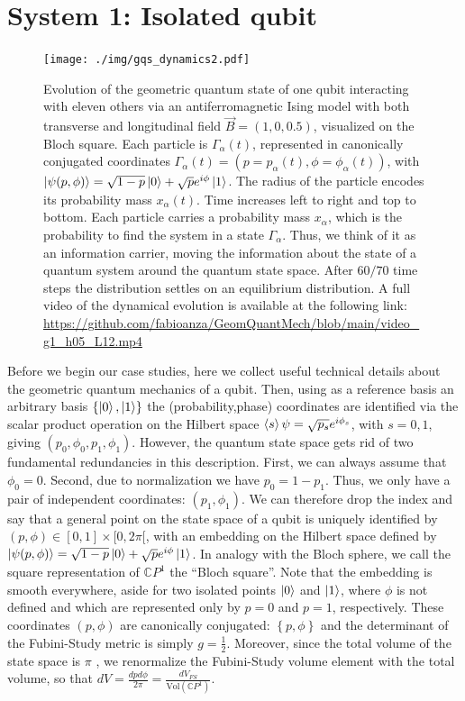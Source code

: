 \documentclass[draft,nofootinbib,pre,twocolumn,showpacs,showkeys,preprintnumbers,floatfix]{revtex4-1}
\newcommand{\1}{\mathbbm{1}}
\begin{document}
\section{System 1: Isolated qubit}
\label{sec:EXAMPLES1}


\begin{figure}[t!]
\centering
\texttt{[image: ./img/gqs\_dynamics2.pdf]}
\caption{Evolution of the geometric quantum state of one qubit interacting with 
	eleven others via an antiferromagnetic Ising model with both transverse and longitudinal field $\vec{B} = (1,0,0.5)$, 
	visualized on the Bloch square. Each particle is $\Gamma_\alpha(t)$, represented in canonically conjugated 
	coordinates $\Gamma_\alpha(t) = \left( p=p_\alpha(t),\phi=\phi_\alpha(t)\right)$, with $\ket{\psi(p,\phi)} = 
	\sqrt{1-p} \ket{0}+ \sqrt{p} e^{i\phi}\ket{1}$. The radius of the particle encodes its 
	probability mass $x_\alpha(t)$. Time increases left to right and top to bottom. Each particle
	carries a probability mass $x_\alpha$, which is the probability to find the system in a 
	state $\Gamma_\alpha$. Thus, we think of it as an information carrier, moving the 
	information about the state of a quantum system around the quantum state space.
	After $60/70$ time steps the distribution settles on an equilibrium distribution. A full video 
	of the dynamical evolution is available at the following link: \url{https://github.com/fabioanza/GeomQuantMech/blob/main/video_g1_h05_L12.mp4}
	}
\label{fig:gqs_dynamics2}
\end{figure}

Before we begin our case studies, here we collect useful technical details
about the geometric quantum mechanics of a qubit. Then, using as a reference 
basis an arbitrary basis $\left\{ \ket{0},\ket{1}\right\}$ 
the (probability,phase) coordinates are identified via the scalar product operation
on the Hilbert space $\braket{s}{\psi} = \sqrt{p_s}e^{i\phi_s}$, with $s=0,1$, giving $(p_0,\phi_0,p_1,\phi_1)$. 
However, the quantum state space gets rid of two fundamental redundancies in this description.
First, we can always assume that $\phi_0 = 0$. Second, due to normalization we have
$p_0 = 1-p_1$. Thus, we only have a pair of independent coordinates: $(p_1,\phi_1)$.
We can therefore drop the index and say that a general point on the state space
of a qubit is uniquely identified by $(p,\phi) \in [0,1]\times[0,2\pi[$, with an embedding on the Hilbert space
defined by $\ket{\psi(p,\phi)} = \sqrt{1-p}\ket{0} + \sqrt{p}e^{i\phi}\ket{1}$. In analogy with 
the Bloch sphere, we call the square representation of $\mathbb{C}P^1$ the ``Bloch square''.
Note that the embedding is smooth everywhere, aside for two isolated points $\ket{0}$ and 
$\ket{1}$, where $\phi$ is not defined and which are represented only by $p=0$ and $p=1$, 
respectively. These coordinates $(p,\phi)$ are canonically conjugated: $\left\{ p,\phi\right\}$
and the determinant of the Fubini-Study metric is simply $g= \frac{1}{2}$. Moreover, since the total
volume of the state space is $\pi$ \cite{Bengtsson2017}, we renormalize the Fubini-Study volume element 
with the total volume, so that $dV = \frac{dpd\phi}{2\pi} = \frac{dV_{FS}}{\mathrm{Vol}(\mathbb{C}P^1)}$.
\end{document}
